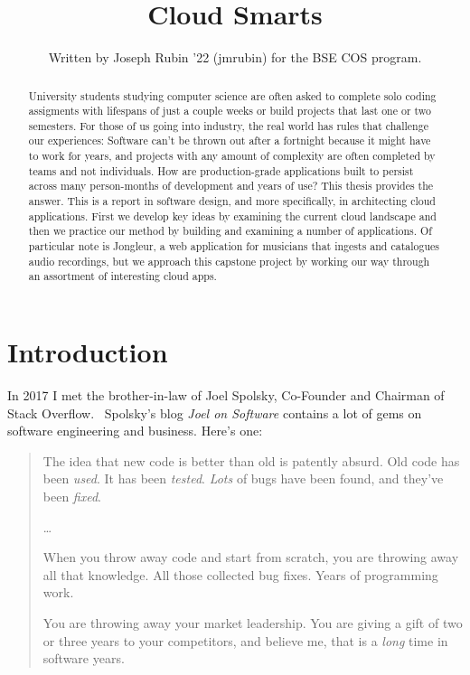 \documentclass{article}
\begin{document}
\title{Cloud Smarts}

\author{Written by Joseph Rubin '22 (jmrubin) for the BSE COS program.}

\date{}
\maketitle

\thispagestyle{empty}


\begin{abstract}
  University students studying computer science are often asked to complete solo coding assigments with lifespans of just a couple weeks or build projects that last one or two semesters.
  For those of us going into industry, the real world has rules that challenge our experiences:
  Software can't be thrown out after a fortnight because it might have to work for years, and projects with any amount of complexity are often completed by teams and not individuals.
  How are production-grade applications built to persist across many person-months of development and years of use?
  This thesis provides the answer.
  This is a report in software design, and more specifically, in architecting cloud applications.
  First we develop key ideas by examining the current cloud landscape and then we practice our method by building and examining a number of applications.
  Of particular note is Jongleur, a web application for musicians that ingests and catalogues audio recordings, but we approach this capstone project by working our way through an assortment of interesting cloud apps.
\end{abstract}

\newpage

\section{Introduction}

In 2017 I met the brother-in-law of Joel Spolsky, Co-Founder and Chairman of Stack Overflow.~\cite{stack-overflow}
Spolsky's blog \textit{Joel on Software} contains a lot of gems on software engineering and business.
Here's one:

\begin{quote}
  The idea that new code is better than old is patently absurd.
  Old code has been \textit{used}.
  It has been \textit{tested}.
  \textit{Lots} of bugs have been found, and they’ve been \textit{fixed}.

  \ldots

  When you throw away code and start from scratch, you are throwing away all that knowledge.
  All those collected bug fixes.
  Years of programming work.

  You are throwing away your market leadership.
  You are giving a gift of two or three years to your competitors, and believe me, that is a \textit{long} time in software years.~\cite{joel-old-code}
\end{quote}
\end{document}
